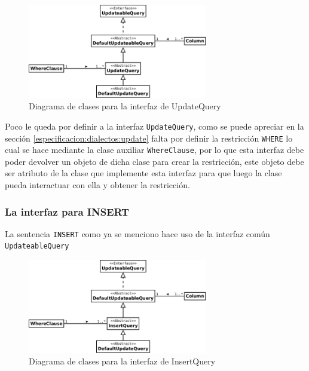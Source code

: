 \begin{figure}
  \centering
    \includegraphics[width=0.7\textwidth]{figuras/jdbgm-dc-update.png}
  \caption{Diagrama de clases para la interfaz de UpdateQuery}
  \label{fig:dc-updatequery}
\end{figure}

Poco le queda por definir a la interfaz \verb=UpdateQuery=, como se puede apreciar en la sección \ref{especificacion:dialectos:update} falta por definir la restricción \verb=WHERE= lo cual se hace mediante la clase auxiliar \verb=WhereClause=, por lo que esta interfaz debe poder devolver un objeto de dicha clase para crear la restricción, este objeto debe ser atributo de la clase que implemente esta interfaz para que luego la clase pueda interactuar con ella y obtener la restricción. 

\subsubsection{La interfaz para INSERT}

La sentencia \verb=INSERT= como ya se menciono hace uso de la interfaz común \verb=UpdateableQuery=

\begin{figure}
  \centering
    \includegraphics[width=0.7\textwidth]{figuras/jdbgm-dc-insert.png}
  \caption{Diagrama de clases para la interfaz de InsertQuery}
  \label{fig:dc-insertquery}
\end{figure}

